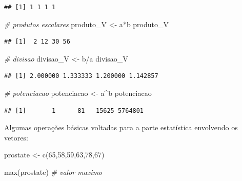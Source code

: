 \documentclass[
]{book}
\newenvironment{Shaded}{\begin{snugshade}}{\end{snugshade}}
\newcommand{\CommentTok}[1]{\textcolor[rgb]{0.56,0.35,0.01}{\textit{#1}}}
\newcommand{\DecValTok}[1]{\textcolor[rgb]{0.00,0.00,0.81}{#1}}
\newcommand{\FunctionTok}[1]{\textcolor[rgb]{0.00,0.00,0.00}{#1}}
\newcommand{\NormalTok}[1]{#1}
\newcommand{\OtherTok}[1]{\textcolor[rgb]{0.56,0.35,0.01}{#1}}
\newcommand{\SpecialCharTok}[1]{\textcolor[rgb]{0.00,0.00,0.00}{#1}}
\begin{document}
\begin{verbatim}
## [1] 1 1 1 1
\end{verbatim}

\begin{Shaded}
\begin{Highlighting}[]
\CommentTok{\# produtos escalares}
\NormalTok{produto\_V }\OtherTok{\textless{}{-}}\NormalTok{ a}\SpecialCharTok{*}\NormalTok{b}
\NormalTok{produto\_V}
\end{Highlighting}
\end{Shaded}

\begin{verbatim}
## [1]  2 12 30 56
\end{verbatim}

\begin{Shaded}
\begin{Highlighting}[]
\CommentTok{\# divisao}
\NormalTok{divisao\_V }\OtherTok{\textless{}{-}}\NormalTok{ b}\SpecialCharTok{/}\NormalTok{a}
\NormalTok{divisao\_V}
\end{Highlighting}
\end{Shaded}

\begin{verbatim}
## [1] 2.000000 1.333333 1.200000 1.142857
\end{verbatim}

\begin{Shaded}
\begin{Highlighting}[]
\CommentTok{\# potenciacao}
\NormalTok{potenciacao }\OtherTok{\textless{}{-}}\NormalTok{ a}\SpecialCharTok{\^{}}\NormalTok{b}
\NormalTok{potenciacao}
\end{Highlighting}
\end{Shaded}

\begin{verbatim}
## [1]       1      81   15625 5764801
\end{verbatim}

Algumas operações básicas voltadas para a parte estatística envolvendo os vetores:

\begin{Shaded}
\begin{Highlighting}[]
\NormalTok{prostate }\OtherTok{\textless{}{-}} \FunctionTok{c}\NormalTok{(}\DecValTok{65}\NormalTok{,}\DecValTok{58}\NormalTok{,}\DecValTok{59}\NormalTok{,}\DecValTok{63}\NormalTok{,}\DecValTok{78}\NormalTok{,}\DecValTok{67}\NormalTok{)}

\FunctionTok{max}\NormalTok{(prostate)      }\CommentTok{\# valor maximo}
\end{Highlighting}
\end{Shaded}
\end{document}
